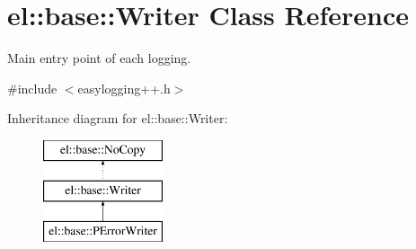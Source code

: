 \hypertarget{classel_1_1base_1_1_writer}{}\section{el\+:\+:base\+:\+:Writer Class Reference}
\label{classel_1_1base_1_1_writer}


Main entry point of each logging.  




{\ttfamily \#include $<$easylogging++.\+h$>$}

Inheritance diagram for el\+:\+:base\+:\+:Writer\+:\begin{figure}[H]
\begin{center}
\leavevmode
\includegraphics[height=3.000000cm]{classel_1_1base_1_1_writer}
\end{center}
\end{figure}
